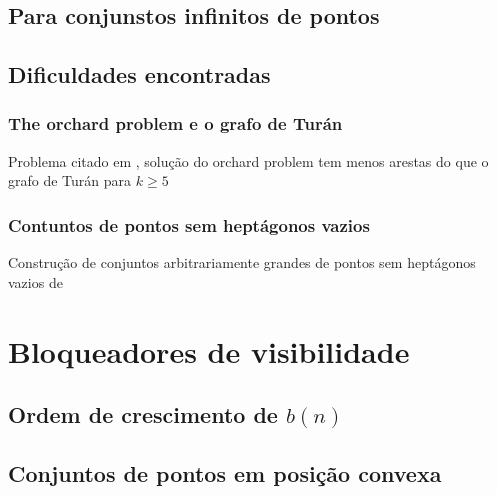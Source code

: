 \documentclass[a4paper]{book}
\begin{document}
\section{Para conjunstos infinitos de pontos}
\cite{infinity}
\section{Dificuldades encontradas}
\subsection{The orchard problem e o grafo de Turán}
Problema citado em \cite{visblock}, solução do orchard problem tem menos arestas do que o grafo de Turán para $k\geq 5$

\subsection{Contuntos de pontos sem heptágonos vazios}
Construção de conjuntos arbitrariamente grandes de pontos sem heptágonos vazios de \cite{heptagon}

\chapter{Bloqueadores de visibilidade}

\section{Ordem de crescimento de $b(n)$}
\cite{block,blockers}

\section{Conjuntos de pontos em posição convexa}
\cite{block,blockers}



{}
\end{document}
